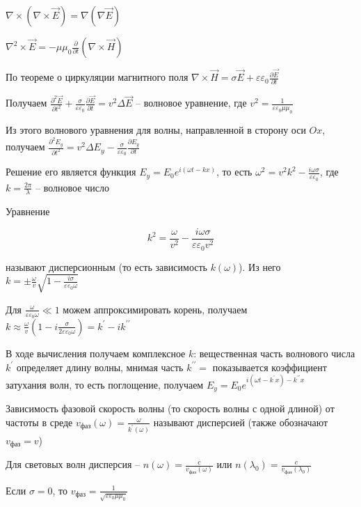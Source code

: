 \documentclass[12pt]{article}
\begin{document}
$\nabla \times (\nabla \times \vec E) = \nabla (\nabla \vec E)$

$\nabla^2 \times \vec E = -\mu\mu_0 \frac{\partial}{\partial t} (\nabla \times \vec H)$

По теореме о циркуляции магнитного поля $\nabla \times \vec H = \sigma \vec E + \varepsilon \varepsilon_0 \frac{\partial \vec E}{\partial t}$

Получаем $\frac{\partial^2 \vec E}{\partial t^2} + \frac{\sigma}{\varepsilon \varepsilon_0} \frac{\partial \vec E}{\partial t} = v^2 \Delta \vec E$ -- волновое уравнение, где $v^2 = \frac{1}{\varepsilon \varepsilon_0 \mu \mu_0}$

Из этого волнового уравнения для волны, направленной в сторону оси $Ox$, получаем $\frac{\partial^2 E_y}{\partial t^2} = v^2 \Delta E_y - \frac{\sigma}{\varepsilon \varepsilon_0} \frac{\partial E_y}{\partial t}$

Решение его является функция $E_y = E_0 e^{i (\omega t - k x)}$, то есть $\omega^2 = v^2 k^2 - \frac{i \omega \sigma}{\varepsilon \varepsilon_0}$, где $k = \frac{2\pi}{\lambda}$ -- волновое число

Уравнение 

\[k^2 = \frac{\omega}{v^2} - \frac{i \omega \sigma}{\varepsilon \varepsilon_0 v^2}\]

называют дисперсионным (то есть зависимость $k(\omega)$). Из него $k = \pm \frac{\omega}{v} \sqrt{1 - \frac{i \sigma}{\varepsilon \varepsilon_0 \omega}}$

Для $\frac{\omega}{\varepsilon\varepsilon_0 \omega} \ll 1$ можем аппроксимировать корень, получаем $k \approx \frac{\omega}{v} \left(1 - i \frac{\sigma}{2\varepsilon\varepsilon_0 \omega}\right) = k^\prime - i k^{\prime\prime}$

В ходе вычисления получаем комплексное $k$: вещественная часть волнового числа $k^\prime$ определяет длину волны, мнимая часть $k^{\prime\prime} = $ показывается коэффициент затухания волн, то есть поглощение, получаем $E_y = E_0 e^{i (\omega t - k^{\prime} x) - k^{\prime\prime} x}$

Зависимость фазовой скорость волны (то скорость волны с одной длиной) от частоты в среде $v_\text{фаз}(\omega) = \frac{\omega}{k^{\prime}(\omega)}$ называют дисперсией (также обозначают $v_{\text{фаз}} = v$)

Для световых волн дисперсия -- $n(\omega) = \frac{c}{v_{\text{фаз}}(\omega)}$ или $n(\lambda_0) = \frac{c}{v_{\text{фаз}}(\lambda_0)}$

Если $\sigma = 0$, то $v_{\text{фаз}} = \frac{1}{\sqrt{\varepsilon \varepsilon_0 \mu \mu_0}}$
\end{document}
